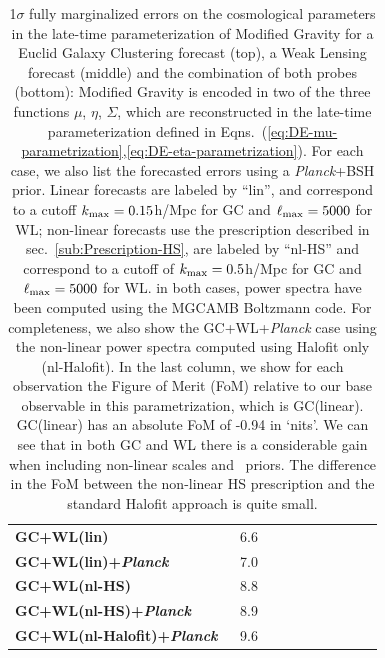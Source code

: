 \begin{table}[htbp]
\begin{tabular}{|l|c|c|c|c|c||c|c|c|c|}
\hline
 \Tstrut \textbf{GC+WL(lin)}  
 
& 6.6 \tabularnewline
\Tstrut \textbf{GC+WL(lin)+{\it Planck}} $\;$  
 
& 7.0  \tabularnewline
\hline
\hline
 \Tstrut \textbf{GC+WL(nl-HS)}  
 
& 8.8 \tabularnewline
\Tstrut \textbf{GC+WL(nl-HS)+{\it Planck}} $\;$  
 
& 8.9  \tabularnewline
\Tstrut \textbf{GC+WL(nl-Halofit)+{\it Planck}} $\;$ 

& 9.6  \tabularnewline
\hline  
\end{tabular}\protect
\small
\caption[1$\sigma$ marginalized errors for a Euclid GC and WL forecast in the late-time parameterization.]{\label{tab:errors-Euclid-GC-WL-late_time}
1$\sigma$
fully marginalized errors on the cosmological parameters in the late-time parameterization of Modified Gravity for a Euclid
Galaxy Clustering forecast (top), a Weak Lensing forecast (middle) and the combination
of both probes (bottom): 
Modified Gravity is encoded in two of the three functions $\mu$, $\eta$, $\Sigma$, 
which are reconstructed in the late-time parameterization defined in 
Eqns.\ (\ref{eq:DE-mu-parametrization},\ref{eq:DE-eta-parametrization}). For each case, we also list
the forecasted errors using a {\it Planck}+BSH prior.
Linear forecasts are labeled by ``lin'', and correspond to a cutoff $k_{\rm max}=0.15$h/Mpc for GC and $\ell_{\rm max}=5000$ for WL; 
non-linear forecasts use the prescription described in 
sec.\ \ref{sub:Prescription-HS}, are labeled by ``nl-HS'' and correspond to a cutoff of $k_{\rm max}=0.5$h/Mpc for GC and $\ell_{\rm max}=5000$ for WL.
in both cases, power spectra have been computed using the MGCAMB Boltzmann code. For completeness,
we also show the GC+WL+{\it Planck} case using the non-linear power spectra computed using Halofit only (nl-Halofit).
In the last column, we show for each observation the Figure of Merit (FoM) 
relative to our base observable in this parametrization, which is GC(linear).
GC(linear) has an absolute FoM of -0.94 in `nits'.
We can see that in both GC and WL there is a considerable gain when including non-linear scales and \planck\ priors.
The difference in the FoM between the non-linear HS prescription and the standard Halofit approach
is quite small. 
}
\end{table}
\normalsize

